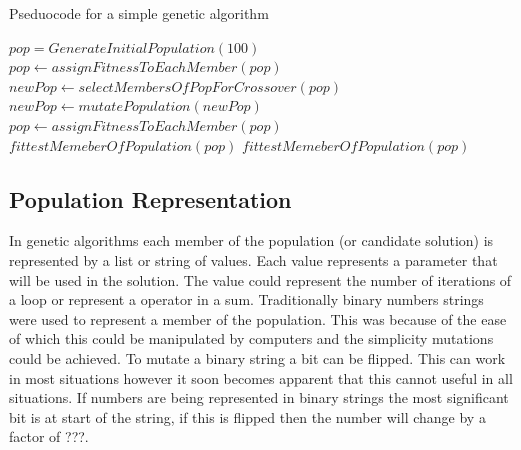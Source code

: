 \documentclass[12pt]{article}
\begin{document}
\begin{algorithm}
\caption{Pseduocode for a simple genetic algorithm}
\label{Genetic algorithm pseduocode}
\begin{algorithmic}

\State $pop = GenerateInitialPopulation(100)$
\State $pop \gets assignFitnessToEachMember(pop)$
	\State $newPop \gets selectMembersOfPopForCrossover(pop)$
	\State $newPop \gets mutatePopulation(newPop)$
	\State $pop \gets assignFitnessToEachMember(pop)$
		\State \Return $fittestMemeberOfPopulation(pop)$
	\EndIf
\EndWhile
\State \Return $fittestMemeberOfPopulation(pop)$


\end{algorithmic}
\end{algorithm}

\subsection{Population Representation}
In genetic algorithms each member of the population (or candidate solution) is represented by a list or string of values.
Each value represents a parameter that will be used in the solution.
The value could represent the number of iterations of a loop or represent a operator in a sum.
Traditionally binary numbers strings were used to represent a member of the population.
This was because of the ease of which this could be manipulated by computers and the simplicity mutations could be achieved.
To mutate a binary string a bit can be flipped.
This can work in most situations however it soon becomes apparent that this cannot useful in all situations.
If numbers are being represented in binary strings the most significant bit is at start of the string, if this is flipped then the number will change by a factor of ???.
\end{document}
